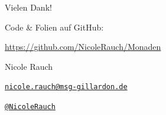 %


{
\begin{frame}{Vielen Dank!}

        Code \& Folien auf GitHub:
        \begin{center}
                \url{https://github.com/NicoleRauch/Monaden}
        \end{center}

        \begin{block}{Nicole Rauch}
        \begin{description}[Twitterxx]
                \item[E-Mail]  \href{mailto:nicole.rauch@msg-gillardon.de}{\texttt{nicole.rauch@msg-gillardon.de}}
                \item[Twitter] \href{http://twitter.com/NicoleRauch}{\texttt{@NicoleRauch}}
        \end{description}
        \end{block}
\end{frame}
}
